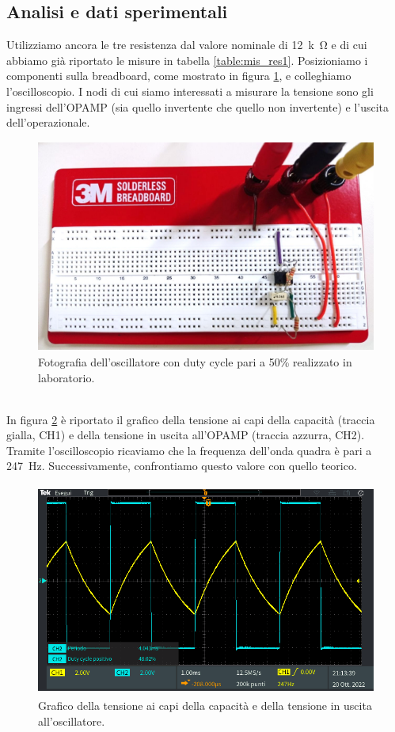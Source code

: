 \documentclass{report}
\begin{document}
\subsection{Analisi e dati sperimentali}
Utilizziamo ancora le tre resistenza dal valore nominale di \SI{12}{k\ohm} e di cui abbiamo già riportato le misure in tabella \ref{table:mis_res1}. Posizioniamo i componenti sulla breadboard, come mostrato in figura \ref{figura:circuito3}, e colleghiamo l'oscilloscopio. I nodi di cui siamo interessati a misurare la tensione sono gli ingressi dell'OPAMP (sia quello invertente che quello non invertente) e l'uscita dell'operazionale.
\begin{figure}[h!]
	\centering
	\includegraphics[height=7cm]{immagini/circuito3}
	\caption{Fotografia dell'oscillatore con duty cycle pari a 50\% realizzato in laboratorio.}
	\label{figura:circuito3}
\end{figure}
\\In figura \ref{figura:oscillo1} è riportato il grafico della tensione ai capi della capacità (traccia gialla, CH1) e della tensione in uscita all'OPAMP (traccia azzurra, CH2). Tramite l'oscilloscopio ricaviamo che la frequenza dell'onda quadra è pari a \SI{247}{\hertz}. Successivamente, confrontiamo questo valore con quello teorico.
\begin{figure}[h!]
	\centering
	\includegraphics[height=7cm]{immagini/TEK00025}
	\caption{Grafico della tensione ai capi della capacità e della tensione in uscita all'oscillatore.}
	\label{figura:oscillo1}
\end{figure}
\end{document}
